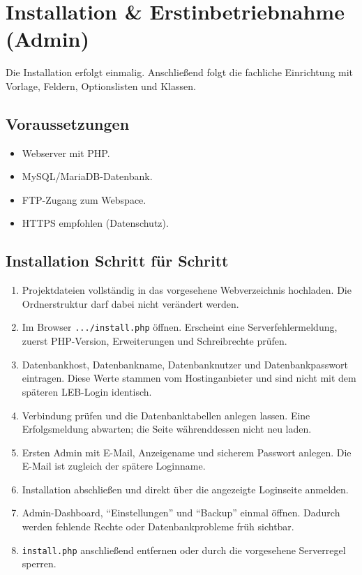 \documentclass[12pt,a4paper]{article}
\begin{document}
\section{Installation \& Erstinbetriebnahme (Admin)}\label{sec:installation}
Die Installation erfolgt einmalig. Anschließend folgt die fachliche Einrichtung mit Vorlage, Feldern, Optionslisten und Klassen.

\subsection{Voraussetzungen}
\begin{itemize}
  \item Webserver mit PHP.
  \item MySQL/MariaDB-Datenbank.
  \item FTP-Zugang zum Webspace.
  \item HTTPS empfohlen (Datenschutz).
\end{itemize}

\subsection{Installation Schritt für Schritt}
\begin{enumerate}
  \item Projektdateien vollständig in das vorgesehene Webverzeichnis hochladen. Die Ordnerstruktur darf dabei nicht verändert werden.
  \item Im Browser \texttt{.../install.php} öffnen. Erscheint eine Serverfehlermeldung, zuerst PHP-Version, Erweiterungen und Schreibrechte prüfen.
  \item Datenbankhost, Datenbankname, Datenbanknutzer und Datenbankpasswort eintragen. Diese Werte stammen vom Hostinganbieter und sind nicht mit dem späteren LEB-Login identisch.
  \item Verbindung prüfen und die Datenbanktabellen anlegen lassen. Eine Erfolgsmeldung abwarten; die Seite währenddessen nicht neu laden.
  \item Ersten Admin mit E-Mail, Anzeigename und sicherem Passwort anlegen. Die E-Mail ist zugleich der spätere Loginname.
  \item Installation abschließen und direkt über die angezeigte Loginseite anmelden.
  \item Admin-Dashboard, \enquote{Einstellungen} und \enquote{Backup} einmal öffnen. Dadurch werden fehlende Rechte oder Datenbankprobleme früh sichtbar.
  \item \texttt{install.php} anschließend entfernen oder durch die vorgesehene Serverregel sperren.
\end{enumerate}
\end{document}
